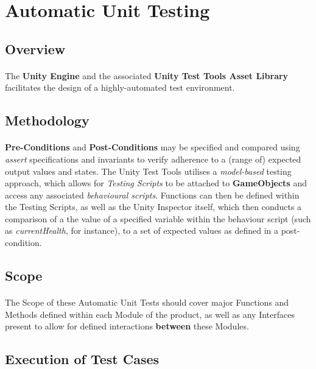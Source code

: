 \documentclass{article}
\begin{document}
    \section{Automatic Unit Testing}
    \subsection{Overview}
    \paragraph{} The \textbf{Unity Engine} and the associated \textbf{Unity Test Tools Asset Library} facilitates the design of a highly-automated test environment.
    
    \subsection{Methodology}
    \paragraph{} \textbf{Pre-Conditions} and \textbf{Post-Conditions} may be specified and compared using \emph{assert} specifications and invariants to verify adherence to a (range of) expected output values and states. The Unity Test Tools utilises a \emph{model-based} testing approach, which allows for \emph{Testing Scripts} to be attached to \textbf{GameObjects} and access any associated \emph{behavioural scripts}. Functions can then be defined within the Testing Scripts, as well as the Unity Inspector itself, which then conducts a comparison of a the value of a specified variable within the behaviour script (such as \emph{currentHealth}, for instance), to a set of expected values as defined in a post-condition.
    
    \subsection{Scope} 
    \paragraph{}The Scope of these Automatic Unit Tests should cover major Functions and Methods defined within each Module of the product, as well as any Interfaces present to allow for defined interactions \textbf{between} these Modules.
    
    \subsection{Execution of Test Cases}
\end{document}
